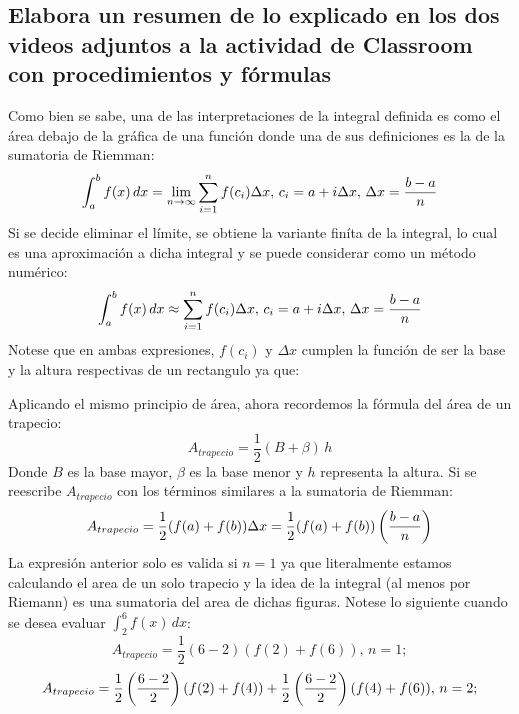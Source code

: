 \documentclass[letterpaper, 12pt]{article}
\begin{document}
\thispagestyle{fancy}
\subsection*{Elabora un resumen de lo explicado en los dos videos adjuntos a la actividad de Classroom con procedimientos y fórmulas}
\justify
Como bien se sabe, una de las interpretaciones de la integral definida es como el área debajo de la gráfica de una función donde una de sus definiciones
es la de la sumatoria de Riemman:
{\large \[\int_a^b f(x)\, dx =\lim_{n \rightarrow \infty}\sum_{i=1}^{n}f(c_i)\Delta x,\, c_i=a+i\Delta x,\, \Delta x = {b-a\over n}\]}
\justify
Si se decide eliminar el límite, se obtiene la variante finíta de la integral, lo cual es una aproximación a dicha integral y se puede considerar como
un método numérico:
{\large \[\int_a^b f(x)\, dx \approx \sum_{i=1}^{n}f(c_i)\Delta x,\, c_i=a+i\Delta x,\, \Delta x = {b-a\over n}\]}
\justify
Notese que en ambas expresiones, \(f(c_i)\) y \(\Delta x\) cumplen la función de ser la base y la altura respectivas de un rectangulo ya que:
\\
\begin{center}
\end{center}
Aplicando el mismo principio de área, ahora recordemos la fórmula del área de un trapecio:
{\large \[A_{trapecio}=\frac{1}{2}(B+\beta)\, h\]}
\justify
Donde \(B\) es la base mayor, \(\beta\) es la base menor y \(h\) representa la altura. Si se reescribe \(A_{trapecio}\) con los términos similares a la sumatoria de Riemman:
{\large \[A_{trapecio}=\frac{1}{2}(f(a)+f(b))\Delta x=\frac{1}{2}(f(a)+f(b))\left({b-a\over n}\right)\]}
\justify
La expresión anterior solo es valida si \(n=1\) ya que literalmente estamos calculando el area de un solo trapecio y la idea de la integral (al menos por Riemann) es una sumatoria del area
de dichas figuras. Notese lo siguiente cuando se desea evaluar \(\int_2^6 f(x)\, dx\):
{\large \[A_{trapecio}=\frac{1}{2}(6-2)(f(2)+f(6)),\, n=1;\]}
{\large \[A_{trapecio}=\frac{1}{2}\left({6-2 \over 2}\right)(f(2)+f(4))+\frac{1}{2}\left({6-2 \over 2}\right)(f(4)+f(6)),\, n=2;\]}
\end{document}
